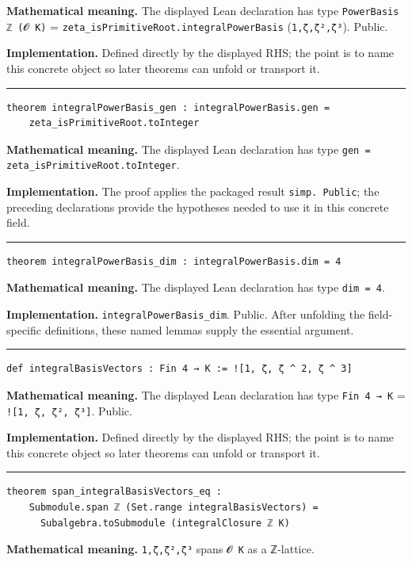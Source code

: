\documentclass[UTF8,a4paper,11pt,fontset=fandol]{ctexart}
\theoremstyle{definition}
\newcommand{\statementsep}{\par\medskip\hrule\medskip}
\begin{document}
\noindent\textbf{Mathematical meaning.} The displayed Lean declaration has type \texttt{PowerBasis ℤ (𝓞 K)} = \texttt{zeta\_\allowbreak{}isPrimitiveRoot.\allowbreak{}integralPowerBasis} (\texttt{1,ζ,ζ²,ζ³}). Public.\par
\noindent\textbf{Implementation.} Defined directly by the displayed RHS; the point is to name this concrete object so later theorems can unfold or transport it.\par
\statementsep
\begin{verbatim}
theorem integralPowerBasis_gen : integralPowerBasis.gen =
    zeta_isPrimitiveRoot.toInteger
\end{verbatim}
\noindent\textbf{Mathematical meaning.} The displayed Lean declaration has type \texttt{gen = zeta\_\allowbreak{}isPrimitiveRoot.\allowbreak{}toInteger}.\par
\noindent\textbf{Implementation.} The proof applies the packaged result \texttt{simp.\allowbreak{} Public}; the preceding declarations provide the hypotheses needed to use it in this concrete field.\par
\statementsep
\begin{verbatim}
theorem integralPowerBasis_dim : integralPowerBasis.dim = 4
\end{verbatim}
\noindent\textbf{Mathematical meaning.} The displayed Lean declaration has type \texttt{dim = 4}.\par
\noindent\textbf{Implementation.} \texttt{integralPowerBasis\_\allowbreak{}dim}. Public. After unfolding the field-specific definitions, these named lemmas supply the essential argument.\par
\statementsep
\begin{verbatim}
def integralBasisVectors : Fin 4 → K := ![1, ζ, ζ ^ 2, ζ ^ 3]
\end{verbatim}
\noindent\textbf{Mathematical meaning.} The displayed Lean declaration has type \texttt{Fin 4 → K} = \texttt{![1, ζ, ζ², ζ³]}. Public.\par
\noindent\textbf{Implementation.} Defined directly by the displayed RHS; the point is to name this concrete object so later theorems can unfold or transport it.\par
\statementsep
\begin{verbatim}
theorem span_integralBasisVectors_eq :
    Submodule.span ℤ (Set.range integralBasisVectors) =
      Subalgebra.toSubmodule (integralClosure ℤ K)
\end{verbatim}
\noindent\textbf{Mathematical meaning.} \texttt{1,ζ,ζ²,ζ³} spans \texttt{𝓞 K} as a ℤ-lattice.\par
\end{document}
